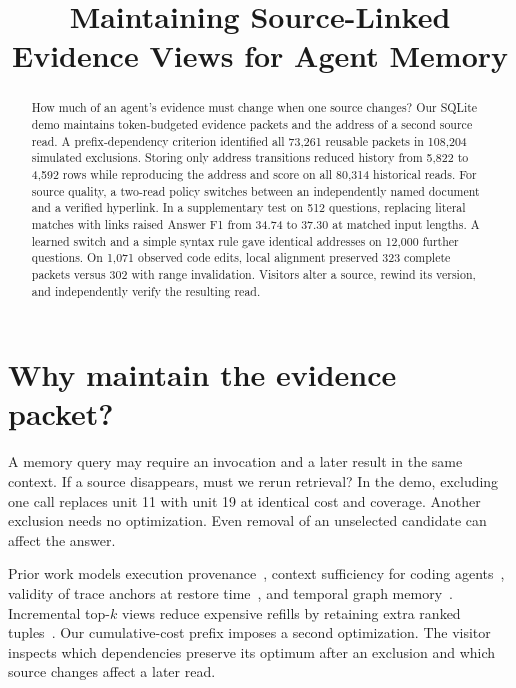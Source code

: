 \documentclass[conference]{IEEEtran}
\title{Maintaining Source-Linked Evidence Views for Agent Memory}
\author{\IEEEauthorblockN{Anonymous authors}}
\begin{document}
\maketitle
\begin{abstract}
How much of an agent's evidence must change when one source changes? Our SQLite demo maintains token-budgeted evidence packets and the address of a second source read. A prefix-dependency criterion identified all 73,261 reusable packets in 108,204 simulated exclusions. Storing only address transitions reduced history from 5,822 to 4,592 rows while reproducing the address and score on all 80,314 historical reads. For source quality, a two-read policy switches between an independently named document and a verified hyperlink. In a supplementary test on 512 questions, replacing literal matches with links raised Answer F1 from 34.74 to 37.30 at matched input lengths. A learned switch and a simple syntax rule gave identical addresses on 12,000 further questions. On 1,071 observed code edits, local alignment preserved 323 complete packets versus 302 with range invalidation. Visitors alter a source, rewind its version, and independently verify the resulting read.

\end{abstract}

\section{Why maintain the evidence packet?}

A memory query may require an invocation and a later result in the same context. If a source disappears, must we rerun retrieval? In the demo, excluding one call replaces unit 11 with unit 19 at identical cost and coverage. Another exclusion needs no optimization. Even removal of an unselected candidate can affect the answer.

Prior work models execution provenance~\cite{wang}, context sufficiency for coding agents~\cite{feng}, validity of trace anchors at restore time~\cite{memtrace}, and temporal graph memory~\cite{tape}. Incremental top-$k$ views reduce expensive refills by retaining extra ranked tuples~\cite{topk}. Our cumulative-cost prefix imposes a second optimization. The visitor inspects which dependencies preserve its optimum after an exclusion and which source changes affect a later read.
\end{document}
